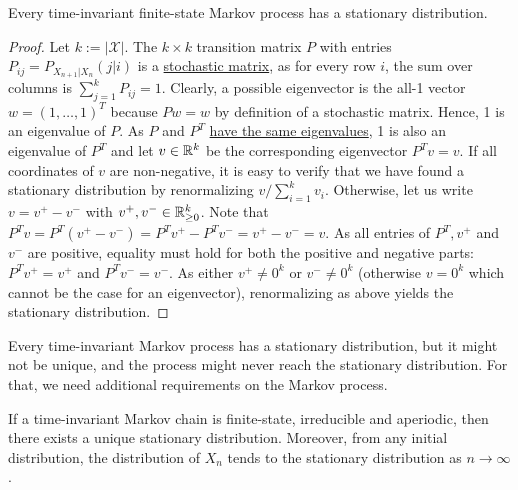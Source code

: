 \begin{proposition}
Every time-invariant finite-state Markov process has a stationary distribution.
\end{proposition}
\begin{proof}
Let $k:= |\mathcal{X}|$. The $k \times k$ transition matrix $P$ with entries $P_{ij} = P_{X_{n+1}|X_n}(j|i)$
is a \href{https://en.wikipedia.org/wiki/Stochastic_matrix}{stochastic matrix}, as for every row $i$, the sum over columns is
$\sum_{j=1}^k P_{ij} = 1$. Clearly, a possible eigenvector is the all-1
vector $w=(1,\ldots,1)^T$ because $P w = w$ by definition of a
stochastic matrix. Hence, 1 is an eigenvalue of $P$. As $P$ and $P^T$ \href{https://math.stackexchange.com/questions/123923/a-matrix-and-its-transpose-have-the-same-set-of-eigenvalues/123927}{have the same eigenvalues}, 1 is
also an eigenvalue of $P^T$ and let $v \in \mathbb{R}^k$ be the corresponding eigenvector
$P^T v = v$. If all coordinates of $v$ are non-negative, it is easy to
verify that we have found a
stationary distribution by renormalizing $v / \sum_{i=1}^k v_i$. Otherwise,
let us write $v = v^+ - v^-$ with $v^+,v^- \in \mathbb{R}_{\geq 0}^k$. Note
that $P^T v = P^T (v^+ - v^-) = P^T v^+ - P^T v^- = v^+ - v^- = v$. As all entries
of $P^T, v^+$ and $v^-$ are positive, equality must hold for both the
positive and negative parts: $P^T v^+ = v^+$ and $P^T v^- = v^-$. As either $v^+ \neq 0^k$ or $v^-
\neq 0^k$ (otherwise $v = 0^k$ which cannot be the case for an
eigenvector), renormalizing as above yields the stationary distribution.
\end{proof}

Every time-invariant Markov process has a stationary distribution, but it might not be unique, and the process might never reach the stationary distribution. For that, we need additional requirements on the Markov process.

\begin{proposition}
If a time-invariant Markov chain is finite-state, irreducible and aperiodic, then there exists a unique stationary distribution. Moreover, from any initial distribution, the distribution of $X_n$ tends to the stationary distribution as $n \to \infty$.
\end{proposition}


